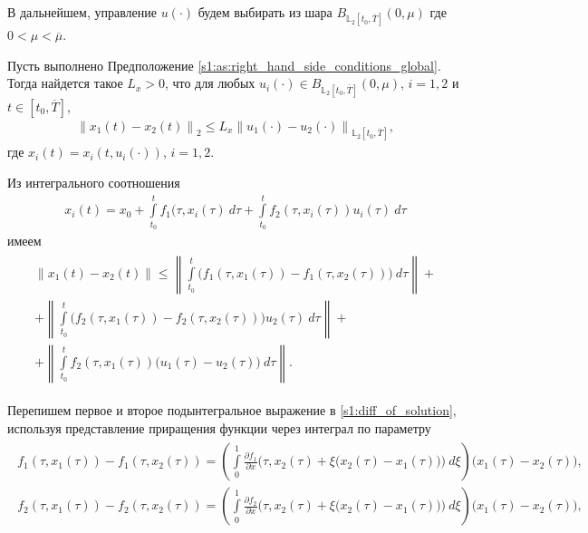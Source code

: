 \documentclass[../main.tex]{subfiles}
\begin{document}
В дальнейшем, управление $ u(\cdot) $ будем выбирать из шара $ B_{\mathbb{L}_2[t_0, \overline{T}]}(0,\mu) $ где $ 0 < \mu < \overline{\mu} $.
    
\begin{lemma}\label{s1:lem:lip_of_solutions_global}
    Пусть выполнено Предположение \ref{s1:as:right_hand_side_conditions_global}.
    Тогда найдется такое $L_x > 0$, что для любых $u_i(\cdot) \in B_{\mathbb{L}_2[t_0, \overline{T}]}(0,\mu) $, $i = 1,2$ и $t \in [t_0, \overline{T}]$, 
    \begin{gather*}
        \left\| x_1(t) - x_2(t) \right\|_2 \leqslant L_x \left\|u_1(\cdot) - u_2(\cdot) \right\|_{\mathbb{L}_2[t_0, \overline{T}]}, 
    \end{gather*}
    где $x_i(t) = x_i(t,u_i(\cdot))$, $i = 1,2$. 
\end{lemma}
\doc
Из интегрального соотношения
\begin{gather*}
     x_i(t) = x_0 + \int\limits_{t_0}^{t} f_1(\tau, x_i(\tau)\ d\tau + \int\limits_{t_0}^{t} f_2(\tau,x_i(\tau))u_i(\tau)\ d\tau 
\end{gather*}
имеем 
\begin{gather}\label{s1:diff_of_solution}
\begin{gathered}
    \| x_1(t) - x_2(t) \| \leqslant 
    \left\|  \int\limits_{t_0}^{t} \Big( f_1(\tau, x_1(\tau)) - f_1(\tau, x_2(\tau)) \Big) \ d\tau \right\| +  \\ + 
    \left\|  \int\limits_{t_0}^{t} \Big( f_2(\tau, x_1(\tau)) - f_2(\tau,x_2(\tau)) \Big) u_2(\tau) \ d\tau \right\| + \\ +
    \left\|  \int\limits_{t_0}^{t} f_2(\tau,x_1(\tau)) \big( u_1(\tau) - u_2(\tau) \big) \ d\tau \right\|. 
\end{gathered}
\end{gather}
    
Перепишем первое и второе подынтегральное выражение в \eqref{s1:diff_of_solution}, используя представление приращения функции через интеграл по параметру
\begin{gather}\label{s1:meanvalue}
\begin{gathered}
    f_1(\tau, x_1(\tau)) - f_1(\tau, x_2(\tau)) = \left(  \int\limits_0^1 \frac{\partial f_1}{\partial x} \Big(\tau, x_2(\tau) + \xi \big(x_2(\tau) - x_1(\tau)\big)\Big) \ d\xi \right) \big(x_1(\tau) - x_2(\tau)\big), \\ 
    f_2(\tau, x_1(\tau)) - f_2(\tau, x_2(\tau)) = \left(  \int\limits_0^1 \frac{\partial f_2}{\partial x} \Big(\tau, x_2(\tau) + \xi \big(x_2(\tau) - x_1(\tau)\big)\Big) \ d\xi \right) \big(x_1(\tau) - x_2(\tau)\big), 
\end{gathered}
\end{gather}
    
\end{document}
